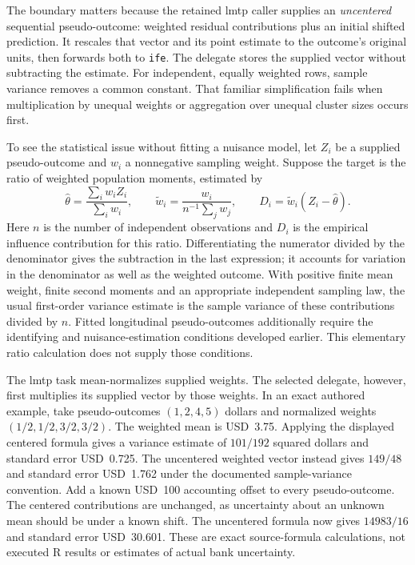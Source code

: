 The boundary matters because the retained lmtp caller supplies an
\emph{uncentered} sequential pseudo-outcome: weighted residual contributions
plus an initial shifted prediction. It rescales that vector and its point
estimate to the outcome's original units, then forwards both to \texttt{ife}.
The delegate stores the supplied vector without subtracting the estimate.
For independent, equally weighted rows, sample variance removes a common
constant. That familiar simplification fails when multiplication by unequal
weights or aggregation over unequal cluster sizes occurs first.
\citep{exec22_lmtp_reuse,rel23ifecaller,rel23ife}

To see the statistical issue without fitting a nuisance model, let $Z_i$ be
a supplied pseudo-outcome and $w_i$ a nonnegative sampling weight. Suppose
the target is the ratio of weighted population moments, estimated by
\begin{equation}
 \widehat\theta=\frac{\sum_i w_iZ_i}{\sum_i w_i},\qquad
 \widetilde w_i=\frac{w_i}{n^{-1}\sum_j w_j},\qquad
 D_i=\widetilde w_i(Z_i-\widehat\theta).
 \label{rel23:weighted-influence}
\end{equation}
Here $n$ is the number of independent observations and $D_i$ is the empirical
influence contribution for this ratio. Differentiating the numerator divided
by the denominator gives the subtraction in the last expression; it accounts
for variation in the denominator as well as the weighted outcome. With
positive finite mean weight, finite second moments and an appropriate
independent sampling law, the usual first-order variance estimate is the
sample variance of these contributions divided by $n$. Fitted longitudinal
pseudo-outcomes additionally require the identifying and nuisance-estimation
conditions developed earlier. This elementary ratio calculation does not
supply those conditions. \citep{rel23ifewitness}

The lmtp task mean-normalizes supplied weights. The selected delegate,
however, first multiplies its supplied vector by those weights. In an exact
authored example, take pseudo-outcomes $(1,2,4,5)$ dollars and normalized
weights $(1/2,1/2,3/2,3/2)$. The weighted mean is USD~3.75. Applying the
displayed centered formula gives a variance estimate of $101/192$ squared
dollars and standard error USD~0.725. The uncentered weighted vector instead
gives $149/48$ and standard error USD~1.762 under the documented sample-variance
convention. Add a known USD~100 accounting offset to every pseudo-outcome.
The centered contributions are unchanged, as uncertainty about an unknown
mean should be under a known shift. The uncentered formula now gives
$14983/16$ and standard error USD~30.601. These are exact source-formula
calculations, not executed R results or estimates of actual bank uncertainty.
\citep{rel23ife,rel23ifecaller,rel23ifewitness}

